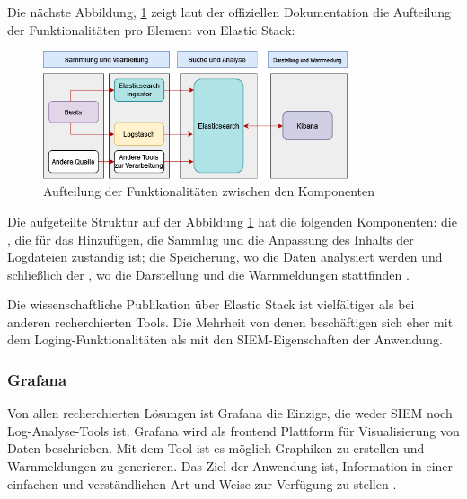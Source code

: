 Die nächste Abbildung, \ref{fig:ElasticKomponenten} zeigt laut der offiziellen Dokumentation die Aufteilung der Funktionalitäten pro Element von Elastic Stack:

\begin{figure}[H]
   \centering
   \includegraphics[width=0.8\textwidth]{assets/ELK_Architektur.png}
   \caption[Aufteilung der Funktionalitäten zwischen den Komponenten]
   {Aufteilung der Funktionalitäten zwischen den Komponenten}
   \label{fig:ElasticKomponenten}
   \centering
\end{figure}

Die aufgeteilte Struktur auf der Abbildung \ref{fig:ElasticKomponenten} hat die folgenden Komponenten: die , die für das Hinzufügen, die Sammlug und die Anpassung des Inhalts der Logdateien zuständig ist; die Speicherung, wo die Daten analysiert werden und schließlich der , wo die Darstellung und die Warnmeldungen stattfinden \citep{elastic_docs}.


Die wissenschaftliche Publikation über Elastic Stack ist vielfältiger als bei anderen recherchierten Tools. Die Mehrheit von denen beschäftigen sich eher mit dem Loging-Funktionalitäten als mit den \gls{SIEM}-Eigenschaften der Anwendung.

\subsubsection{Grafana}
Von allen recherchierten Lösungen ist Grafana die Einzige, die weder \gls{SIEM} noch Log-Analyse-Tools ist. Grafana wird als \gls{frontend} Plattform für Visualisierung von Daten beschrieben. Mit dem Tool ist es möglich Graphiken zu erstellen und Warnmeldungen zu generieren. Das Ziel der Anwendung ist, Information in einer einfachen und verständlichen Art und Weise zur Verfügung zu stellen \citep{redhat_grafana}.

